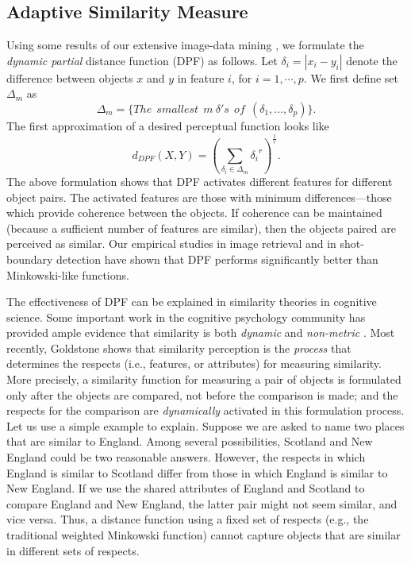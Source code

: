 \vspace*{-3ex}
\subsection{Adaptive Similarity Measure}
\vspace*{-1ex}
\label{sec-dpf}

Using some results of our extensive image-data mining \cite{DPF-ICIP02},
we formulate the {\em dynamic partial} distance function (DPF) as follows.
Let $\delta_i = |x_i-y_i|$ denote the difference 
between objects $x$ and $y$ in feature $i$, for $i=1,\cdots, p$.
We first define set $\Delta_m$ as
\[
\Delta_m = \{ The~~smallest~~m~\delta's~~of~~(\delta_1, ..., \delta_p)\}.
\]
The first approximation of a desired perceptual function looks like
\begin{equation}
d_{DPF}(X, Y) = (\sum\limits_{\delta_i \in \Delta_m}{\delta_i}^{r})^{\frac{1}{r}
}.
\label{eq-dpf}
\end{equation}
The above formulation shows that
DPF activates different features for
different object pairs. The activated features are those
with minimum differences---those which provide coherence
between the objects.  If coherence can be maintained
(because a sufficient number of features are similar), then
the objects paired are perceived as similar.
Our empirical studies in image retrieval \cite{DPF-ICIP02}
and in shot-boundary detection \cite{WC02} have shown that
DPF performs significantly better than Minkowski-like
functions.  

The effectiveness of DPF can be explained in
similarity theories in cognitive science.
Some important work in the cognitive psychology community
has provided ample evidence that
similarity is both {\em dynamic} and {\em non-metric}
\cite{MM85, Tev77}.  Most recently, Goldstone \cite{Gold93}
shows that similarity perception
is the {\em process} that determines the respects (i.e.,
features, or attributes) for measuring similarity.
More precisely, a similarity function for measuring
a pair of objects is formulated only after the objects
are compared, not before the comparison is made; and the
respects for the comparison are {\em dynamically} activated in
this formulation process.  Let us use a simple example to explain.
Suppose we are asked to name two places that are similar
to England.  Among several possibilities, Scotland and
New England could be two reasonable answers.  However,
the respects in which England is similar to Scotland differ from those
in which England is similar to New England.
If we use the shared attributes of
England and Scotland to compare England and New England,
the latter pair might not seem similar, and vice versa.
Thus, a distance function using a fixed set of respects
(e.g., the traditional weighted Minkowski function) cannot
capture objects that are similar in different sets of respects.

